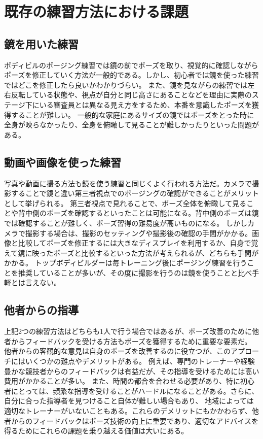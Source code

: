 \section{既存の練習方法における課題}
\subsection{鏡を用いた練習}
ボディビルのポージング練習では鏡の前でポーズを取り、視覚的に確認しながらポーズを修正していく方法が一般的である。しかし、初心者では鏡を使った練習ではどこを修正したら良いかわかりづらい。
また、鏡を見ながらの練習では左右反転している状態や、視点が自分と同じ高さにあることなどを理由に実際のステージ下にいる審査員とは異なる見え方をするため、本番を意識したポーズを獲得することが難しい。
一般的な家庭にあるサイズの鏡ではポーズをとった時に全身が映らなかったり、全身を俯瞰して見ることが難しかったりといった問題がある。
\subsection{動画や画像を使った練習}
写真や動画に撮る方法も鏡を使う練習と同じくよく行われる方法だ。カメラで撮影することで鏡と違い第三者視点でのポージングの確認ができることがメリットとして挙げられる。
第三者視点で見れることで、ポーズ全体を俯瞰して見ることや背中側のポーズを確認するといったことは可能になる。背中側のポーズは鏡では確認することが難しく、ポーズ習得の難易度が高いものになる。
しかしカメラで撮影する場合は、撮影のセッティングや撮影後の確認の手間がかかる。画像と比較してポーズを修正するには大きなディスプレイを利用するか、自身で覚えて鏡に映ったポーズと比較するといった方法が考えられるが、どちらも手間がかかる。
トップボディビルダーは毎トレーニング後にポージング練習を行うことを推奨していることが多いが、その度に撮影を行うのは鏡を使うことと比べ手軽とは言えない。
\subsection{他者からの指導}
上記2つの練習方法はどちらも1人で行う場合ではあるが、ポーズ改善のために他者からフィードバックを受ける方法もポーズを獲得するために重要な要素だ。
他者からの客観的な意見は自身のポーズを改善するのに役立つが、このアプローチにはいくつかの難点やデメリットがある。
例えば、専門のトレーナーや経験豊かな競技者からのフィードバックは有益だが、その指導を受けるためには高い費用がかかることが多い。
また、時間の都合を合わせる必要があり、特に初心者にとっては、頻繁な指導を受けることがハードルになることがある。さらに、自分に合った指導者を見つけること自体が難しい場合もあり、
地域によっては適切なトレーナーがいないこともある。これらのデメリットにもかかわらず、他者からのフィードバックはポーズ技術の向上に重要であり、適切なアドバイスを得るためにこれらの課題を乗り越える価値は大いにある。


